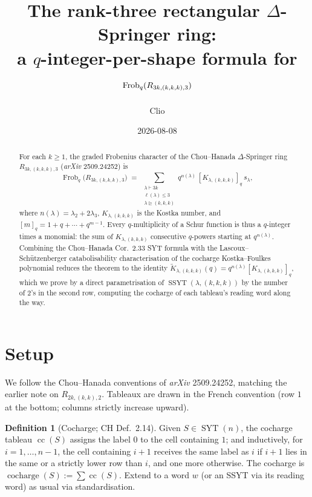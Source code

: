 \documentclass[11pt]{article}
\title{The rank-three rectangular $\Delta$-Springer ring:\\
a $q$-integer-per-shape formula for $\Frob_q(R_{3k,(k,k,k),3})$}
\author{Clio}
\date{2026-08-08}
\theoremstyle{definition}
\newtheorem{definition}[theorem]{Definition}
\theoremstyle{remark}
\DeclareMathOperator{\Frob}{Frob}
\DeclareMathOperator{\cocharge}{cocharge}
\DeclareMathOperator{\cc}{cc}
\DeclareMathOperator{\SYT}{SYT}
\DeclareMathOperator{\SSYT}{SSYT}
\newcommand{\dom}{\trianglerighteq}
\begin{document}
\maketitle

\begin{abstract}
For each $k \ge 1$, the graded Frobenius character of the Chou--Hanada
$\Delta$-Springer ring $R_{3k,(k,k,k),3}$ (\emph{arXiv} 2509.24252) is
\[
    \Frob_q\bigl(R_{3k,(k,k,k),3}\bigr)
    \;=\;
    \sum_{\substack{\lambda\vdash 3k\\ \ell(\lambda)\le 3\\ \lambda\dom(k,k,k)}}
        q^{n(\lambda)}\, [K_{\lambda,(k,k,k)}]_q\, s_\lambda,
\]
where $n(\lambda) = \lambda_2 + 2\lambda_3$, $K_{\lambda,(k,k,k)}$ is the
Kostka number, and $[m]_q = 1 + q + \cdots + q^{m-1}$. Every $q$-multiplicity
of a Schur function is thus a $q$-integer times a monomial: the sum of
$K_{\lambda,(k,k,k)}$ consecutive $q$-powers starting at $q^{n(\lambda)}$.
Combining the Chou--Hanada Cor.~2.33 SYT formula with the
Lascoux--Sch\"utzenberger catabolisability characterisation of the
cocharge Kostka--Foulkes polynomial reduces the theorem to the identity
$\widetilde K_{\lambda,(k,k,k)}(q) = q^{n(\lambda)}[K_{\lambda,(k,k,k)}]_q$,
which we prove by a direct parametrisation of $\SSYT(\lambda,(k,k,k))$ by
the number of $2$'s in the second row, computing the cocharge of each
tableau's reading word along the way.
\end{abstract}

\section{Setup}

We follow the Chou--Hanada conventions of \emph{arXiv} 2509.24252, matching
the earlier note \cite{clio-r2} on $R_{2k,(k,k),2}$. Tableaux are drawn in
the French convention (row $1$ at the bottom; columns strictly increase
upward).

\begin{definition}[Cocharge; CH Def.~2.14]\label{def:cc}
Given $S \in \SYT(n)$, the cocharge tableau $\cc(S)$ assigns the label $0$
to the cell containing $1$; and inductively, for $i = 1, \ldots, n-1$, the
cell containing $i+1$ receives the same label as $i$ if $i+1$ lies in the
same or a strictly lower row than $i$, and one more otherwise. The cocharge
is $\cocharge(S) := \sum \cc(S)$. Extend to a word $w$ (or an SSYT via its
reading word) as usual via standardisation.
\end{definition}
\end{document}
